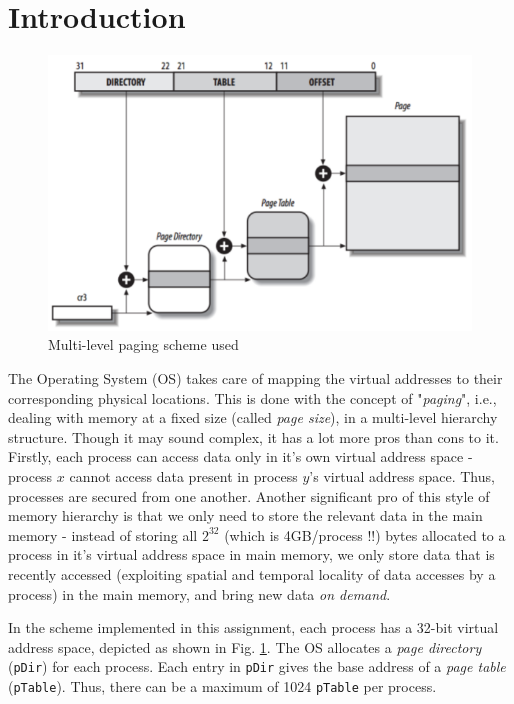 \documentclass[12pt,a4paper,english]{paper}
\begin{document}
\section{Introduction}
\begin{figure}[H]
    \centering
    \includegraphics[scale=0.5]{Paging Hierarchy.png}
    \caption{Multi-level paging scheme used\cite{shichao}}
    \label{fig:hierarchy}
\end{figure}

The Operating System (OS) takes care of mapping the virtual addresses to their corresponding physical locations. This is done with the concept of "\textit{paging}", i.e., dealing with memory at a fixed size (called \textit{page size}), in a multi-level hierarchy structure. Though it may sound complex, it has a lot more pros than cons to it. Firstly, each process can access data only in it's own virtual address space - process $x$ cannot access data present in process $y$'s virtual address space. Thus, processes are secured from one another. Another significant pro of this style of memory hierarchy is that we only need to store the relevant data in the main memory - instead of storing all $2^{32}$ (which is 4GB/process !!) bytes allocated to a process in it's virtual address space in main memory, we only store data that is recently accessed (exploiting spatial and temporal locality of data accesses by a process) in the main memory, and bring new data \textit{on demand}.

In the scheme implemented in this assignment, each process has a 32-bit virtual address space, depicted as shown in Fig. \ref{fig:hierarchy}. The OS allocates a \textit{page directory} (\texttt{pDir}) for each process. Each entry in \texttt{pDir} gives the base address of a \textit{page table} (\texttt{pTable}). Thus, there can be a maximum of 1024 \texttt{pTable} per process.
\end{document}
